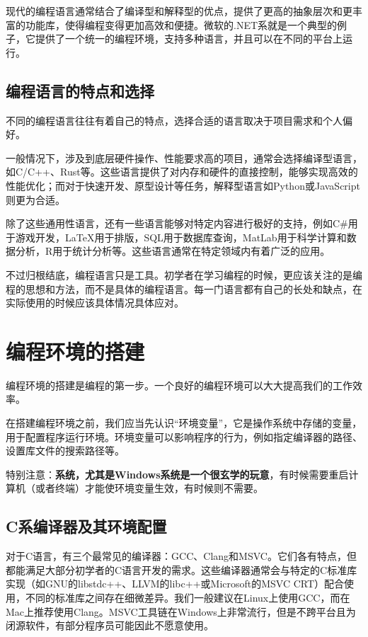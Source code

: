 \documentclass[../main.tex]{subfiles}
\begin{document}
现代的编程语言通常结合了编译型和解释型的优点，提供了更高的抽象层次和更丰富的功能库，使得编程变得更加高效和便捷。微软的.NET系就是一个典型的例子，它提供了一个统一的编程环境，支持多种语言，并且可以在不同的平台上运行。

\subsection{编程语言的特点和选择}

不同的编程语言往往有着自己的特点，选择合适的语言取决于项目需求和个人偏好。

一般情况下，涉及到底层硬件操作、性能要求高的项目，通常会选择编译型语言，如C/C++、Rust等。这些语言提供了对内存和硬件的直接控制，能够实现高效的性能优化；而对于快速开发、原型设计等任务，解释型语言如Python或JavaScript则更为合适。

除了这些通用性语言，还有一些语言能够对特定内容进行极好的支持，例如C\#用于游戏开发，LaTeX用于排版，SQL用于数据库查询，MatLab用于科学计算和数据分析，R用于统计分析等。这些语言通常在特定领域内有着广泛的应用。

不过归根结底，编程语言只是工具。初学者在学习编程的时候，更应该关注的是编程的思想和方法，而不是具体的编程语言。每一门语言都有自己的长处和缺点，在实际使用的时候应该具体情况具体应对。

\section{编程环境的搭建}

编程环境的搭建是编程的第一步。一个良好的编程环境可以大大提高我们的工作效率。

在搭建编程环境之前，我们应当先认识“环境变量”，它是操作系统中存储的变量，用于配置程序运行环境。环境变量可以影响程序的行为，例如指定编译器的路径、设置库文件的搜索路径等。

特别注意：\textbf{系统，尤其是Windows系统是一个很玄学的玩意}，有时候需要重启计算机（或者终端）才能使环境变量生效，有时候则不需要。

\subsection{C系编译器及其环境配置}\label{sec:c-install}

对于C语言，有三个最常见的编译器：GCC、Clang和MSVC。它们各有特点，但都能满足大部分初学者的C语言开发的需求。这些编译器通常会与特定的C标准库实现（如GNU的libstdc++、LLVM的libc++或Microsoft的MSVC CRT）配合使用，不同的标准库之间存在细微差异。我们一般建议在Linux上使用GCC，而在Mac上推荐使用Clang。MSVC工具链在Windows上非常流行，但是不跨平台且为闭源软件，有部分程序员可能因此不愿意使用。
\end{document}
